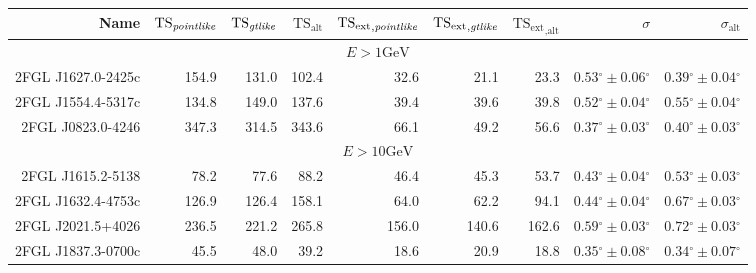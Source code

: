 \documentclass[12pt,preprint]{aastex}
\newcommand{\gev}{\text{GeV}\xspace}
\newcommand{\tsext}{{\ensuremath{\text{TS}_\text{ext}}}\xspace}
\newcommand{\tsextpointlike}{\ensuremath{\tsext_{,\pointlike}}\xspace}
\newcommand{\tsextgtlike}{\ensuremath{\tsext_{,\gtlike}}\xspace}
\newcommand{\tsextalt}{\ensuremath{\tsext_{,\alt}}\xspace}
\newcommand{\ts}{\text{TS}\xspace}
\newcommand{\alt}{\text{alt}\xspace}
\renewcommand{\deg}{\ensuremath{^\circ}\xspace}
\newcommand{\pointlike}{\text{\em pointlike}\xspace}
\newcommand{\gtlike}{\text{\em gtlike}\xspace}
\begin{document}
  \clearpage
  \begin{table}
    \begin{centering}
      \begin{tabular}{r|rrrrrrrr}
        \hline
        \hline
        Name                 &     $\ts_\pointlike$ &        $\ts_\gtlike$ &           $\ts_\alt$ &          \tsextpointlike &           \tsextgtlike &            \tsextalt &                    $\sigma$ &               $\sigma_\alt$ \\
        \hline
        \multicolumn{9}{c}{$E > 1\gev$} \\
        \hline
        2FGL J1627.0-2425c   &                154.9 &                131.0 &                102.4 &                     32.6 &                   21.1 &                 23.3 & $  0.53\deg \pm   0.06\deg$ & $  0.39\deg \pm   0.04\deg$ \\
        2FGL J1554.4-5317c   &                134.8 &                149.0 &                137.6 &                     39.4 &                   39.6 &                 39.8 & $  0.52\deg \pm   0.04\deg$ & $  0.55\deg \pm   0.04\deg$ \\
        2FGL J0823.0-4246    &                347.3 &                314.5 &                343.6 &                     66.1 &                   49.2 &                 56.6 & $  0.37\deg \pm   0.03\deg$ & $  0.40\deg \pm   0.03\deg$ \\
        \hline
        \multicolumn{9}{c}{$E > 10\gev$} \\
        \hline
        2FGL J1615.2-5138    &                 78.2 &                 77.6 &                 88.2 &                     46.4 &                   45.3 &                 53.7 & $  0.43\deg \pm   0.04\deg$ & $  0.53\deg \pm   0.03\deg$ \\
        2FGL J1632.4-4753c   &                126.9 &                126.4 &                158.1 &                     64.0 &                   62.2 &                 94.1 & $  0.44\deg \pm   0.04\deg$ & $  0.67\deg \pm   0.03\deg$ \\
        2FGL J2021.5+4026    &                236.5 &                221.2 &                265.8 &                    156.0 &                  140.6 &                162.6 & $  0.59\deg \pm   0.03\deg$ & $  0.72\deg \pm   0.03\deg$ \\
        2FGL J1837.3-0700c   &                 45.5 &                 48.0 &                 39.2 &                     18.6 &                   20.9 &                 18.8 & $  0.35\deg \pm   0.08\deg$ & $  0.34\deg \pm   0.07\deg$ \\

\end{tabular}
\end{centering}
\end{table}
\end{document}
